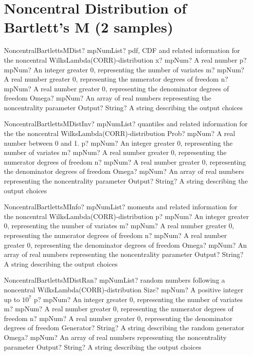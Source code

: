 \documentclass[12pt,a4paper,openany]{book}
\begin{document}
\section{Noncentral Distribution of Bartlett's M (2 samples)}

\begin{mpFunctionsExtract}
\mpFunctionSixNotImplemented
{NoncentralBartlettsMDist? mpNumList? pdf, CDF and related information for the noncentral WilksLambda(CORR)-distribution}
{x? mpNum? A real number}
{p? mpNum? An integer greater 0, representing the number of variates}
{m? mpNum? A real number greater 0, representing the numerator  degrees of freedom}
{n? mpNum? A real number greater 0, representing the denominator degrees of freedom}
{Omega? mpNum? An array of real numbers representing the noncentrality parameter}
{Output? String? A string describing the output choices}
\end{mpFunctionsExtract}

\begin{mpFunctionsExtract}
\mpFunctionSixNotImplemented
{NoncentralBartlettsMDistInv? mpNumList? quantiles and related information for the the noncentral WilksLambda(CORR)-distribution}
{Prob? mpNum? A real number between 0 and 1.}
{p? mpNum? An integer greater 0, representing the number of variates}
{m? mpNum? A real number greater 0, representing the numerator  degrees of freedom}
{n? mpNum? A real number greater 0, representing the denominator degrees of freedom}
{Omega? mpNum? An array of real numbers representing the noncentrality parameter}
{Output? String? A string describing the output choices}
\end{mpFunctionsExtract}

\begin{mpFunctionsExtract}
\mpFunctionFiveNotImplemented
{NoncentralBartlettsMInfo? mpNumList? moments and related information for the noncentral WilksLambda(CORR)-distribution}
{p? mpNum? An integer greater 0, representing the number of variates}
{m? mpNum? A real number greater 0, representing the numerator  degrees of freedom}
{n? mpNum? A real number greater 0, representing the denominator degrees of freedom}
{Omega? mpNum? An array of real numbers representing the noncentrality parameter}
{Output? String? A string describing the output choices}
\end{mpFunctionsExtract}

\begin{mpFunctionsExtract}
\mpFunctionSevenNotImplemented
{NoncentralBartlettsMDistRan? mpNumList? random numbers following a noncentral WilksLambda(CORR)-distribution}
{Size? mpNum? A positive integer up to $10^7$}
{p? mpNum? An integer greater 0, representing the number of variates}
{m? mpNum? A real number greater 0, representing the numerator  degrees of freedom}
{n? mpNum? A real number greater 0, representing the denominator degrees of freedom}
{Generator? String? A string describing the random generator}
{Omega? mpNum? An array of real numbers representing the noncentrality parameter}
{Output? String? A string describing the output choices}
\end{mpFunctionsExtract}
\end{document}
